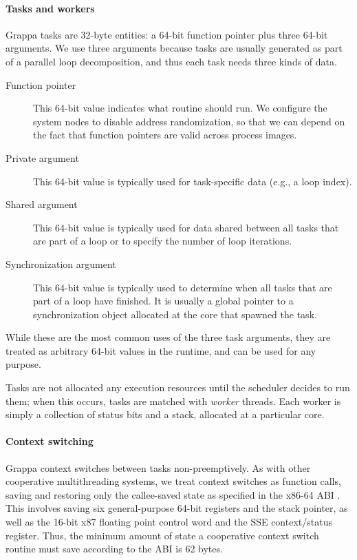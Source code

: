 \paragraph{Tasks and workers} Grappa tasks are 32-byte entities: a
64-bit function pointer plus three 64-bit arguments. We use three
arguments because tasks are usually generated as part of a parallel loop
decomposition, and thus each task needs three kinds of data.
\begin{description}
\item[Function pointer] This 64-bit value indicates what routine
  should run. We configure the system nodes to disable address randomization, so that we can depend on the fact that function pointers are valid across process images.
\item[Private argument] This 64-bit value is typically used for task-specific
  data (e.g., a loop index).
\item[Shared argument] This 64-bit value is typically used for data shared
  between all tasks that are part of a loop or to specify the number
  of loop iterations.
\item[Synchronization argument] This 64-bit value is typically used to determine
  when all tasks that are part of a loop have finished. It is usually
  a global pointer to a synchronization object allocated at the core
  that spawned the task.
\end{description}
While these are the most common uses of the three task arguments, they
are treated as arbitrary 64-bit values in the runtime, and can be used
for any purpose.

Tasks are not allocated any execution resources until the scheduler
decides to run them; when this occurs, tasks are matched with {\em
  worker} threads. Each worker is simply a collection of status bits and a
stack, allocated at a particular core.

\paragraph{Context switching} Grappa context switches between tasks
non-preemptively. As with other cooperative multithreading systems, we
treat context switches as function calls, saving and restoring only the
callee-saved state as specified in the x86-64 ABI \cite{amd64:abi:2012}. This
involves saving six general-purpose 64-bit registers and the stack
pointer, as well as the 16-bit x87 floating point control word and the
SSE context/status register. Thus, the minimum amount of state a
cooperative context switch routine must save according to the ABI is 62
bytes.

